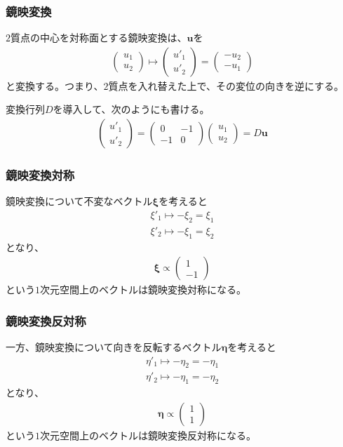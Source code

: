 \documentclass[12pt, t]{beamer}
\newcommand{\lr}[1]{\left({}#1\right){}}
\begin{document}
\begin{frame}
\frametitle{鏡映変換}
$2$質点の中心を対称面とする鏡映変換は、$\bm{u}$を
\begin{align}
  \lr{\begin{array}{c}
        u_1 \\ u_2
      \end{array}} \mapsto
  \lr{\begin{array}{c}
        u'_1 \\ u'_2
      \end{array}} =
  \lr{\begin{array}{c}
        -u_2 \\ -u_1
      \end{array}}
\end{align}
と変換する。つまり、$2$質点を入れ替えた上で、その変位の向きを逆にする。

変換行列$D$を導入して、次のようにも書ける。
\begin{align}
  \lr{\begin{array}{c}
        u'_1 \\ u'_2
      \end{array}} =
  \lr{\begin{array}{cc}
        0 & -1 \\
        -1 & 0
      \end{array}}
  \lr{\begin{array}{c}
        u_1 \\ u_2
      \end{array}} = D \bm{u}
\end{align}


\end{frame}

\begin{frame}
\frametitle{鏡映変換対称}
鏡映変換について不変なベクトル$\bm{\xi}$を考えると
\begin{align}
  \xi'_1 \mapsto -\xi_2 = \xi_1 \\
  \xi'_2 \mapsto -\xi_1 = \xi_2
\end{align}
となり、
\begin{align}
  \bm{\xi} \propto \lr{\begin{array}{c} 1 \\ -1 \end{array}}
\end{align}
という$1$次元空間上のベクトルは鏡映変換対称になる。
\end{frame}

\begin{frame}
\frametitle{鏡映変換反対称}
一方、鏡映変換について向きを反転するベクトル$\bm{\eta}$を考えると
\begin{align}
  \eta'_1 \mapsto -\eta_2 = -\eta_1 \\
  \eta'_2 \mapsto -\eta_1 = -\eta_2
\end{align}
となり、
\begin{align}
  \bm{\eta} \propto \lr{\begin{array}{c} 1 \\ 1 \end{array}}
\end{align}
という$1$次元空間上のベクトルは鏡映変換反対称になる。
\end{frame}
\end{document}
